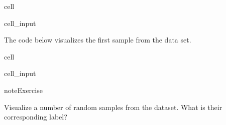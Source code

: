 \documentclass[letterpaper,10pt,english]{jupyterBook}
\begin{document}
\begin{sphinxuseclass}{cell}\begin{sphinxVerbatimInput}

\begin{sphinxuseclass}{cell_input}
\begin{sphinxVerbatim}[commandchars=\\\{\}]
   
\end{sphinxVerbatim}

\end{sphinxuseclass}\end{sphinxVerbatimInput}

\end{sphinxuseclass}
\sphinxAtStartPar
The code below visualizes the first sample from the data set.

\begin{sphinxuseclass}{cell}\begin{sphinxVerbatimInput}

\begin{sphinxuseclass}{cell_input}
\begin{sphinxVerbatim}[commandchars=\\\{\}]
\PYG{p}{[}\PYG{p}{]}\PYG{p}{[}\PYG{p}{]} 
\PYG{p}{[}\PYG{p}{]}\PYG{p}{[}\PYG{p}{]}
\end{sphinxVerbatim}

\end{sphinxuseclass}\end{sphinxVerbatimInput}

\end{sphinxuseclass}
\begin{sphinxadmonition}{note}{Exercise}

\sphinxAtStartPar
Visualize a number of random samples from the dataset. What is their corresponding label?
\end{sphinxadmonition}
\end{document}
